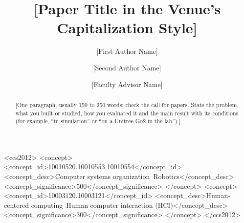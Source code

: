 \documentclass[sigconf,review,anonymous]{acmart}
\begin{document}
\title{[Paper Title in the Venue's Capitalization Style]}

\author{[First Author Name]}

\author{[Second Author Name]}

\author{[Faculty Advisor Name]}

\renewcommand{\shortauthors}{[Surname] et al.}

\begin{abstract}
[One paragraph, usually 150 to 250 words; check the call for papers. State the
problem, what you built or studied, how you evaluated it and the main result
with its conditions (for example, ``in simulation'' or ``on a Unitree Go2 in the
lab'').]
\end{abstract}

\begin{CCSXML}
<ccs2012>
   <concept>
       <concept_id>10010520.10010553.10010554</concept_id>
       <concept_desc>Computer systems organization~Robotics</concept_desc>
       <concept_significance>500</concept_significance>
   </concept>
   <concept>
       <concept_id>10003120.10003121</concept_id>
       <concept_desc>Human-centered computing~Human computer interaction (HCI)</concept_desc>
       <concept_significance>300</concept_significance>
   </concept>
</ccs2012>
\end{CCSXML}

\end{document}
